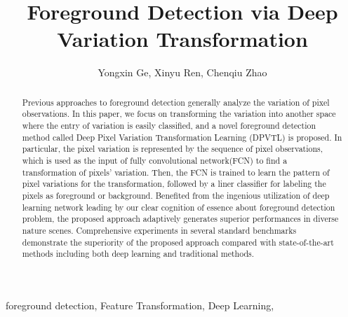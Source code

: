 \documentclass[journal]{IEEEtran}
\begin{document}
\title{Foreground Detection via Deep Variation Transformation}

\author{Yongxin Ge, 
        Xinyu Ren, 
        Chenqiu Zhao}




\maketitle



\begin{abstract}
%
Previous approaches to foreground detection generally analyze the variation of pixel observations.
In this paper, we focus on transforming the variation into another space where the entry of variation is easily classified, and a novel foreground detection method called Deep Pixel Variation Transformation Learning (DPVTL) is proposed.
In particular, the pixel variation is represented by the sequence of pixel observations, which is used as the input of fully convolutional network(FCN) to find a transformation of pixels' variation.
Then, the FCN is trained to learn the pattern of pixel variations for the transformation, followed by a liner classifier for labeling the pixels as foreground or background.
%    
Benefited from the ingenious utilization of deep learning network leading by our clear cognition of essence about foreground detection problem,
the proposed approach adaptively generates superior performances in diverse nature scenes.
%
Comprehensive experiments in several standard benchmarks demonstrate the superiority of the proposed approach compared with state-of-the-art methods including both deep learning and traditional methods.
%
\end{abstract}

\begin{IEEEkeywords} 
    foreground detection, Feature Transformation, Deep Learning,
\end{IEEEkeywords}
\end{document}
